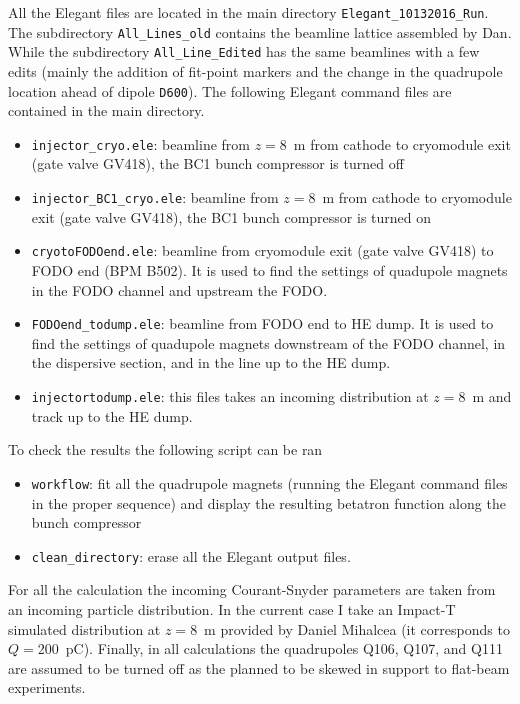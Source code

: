 \documentclass[notitlepage,twocolumn,nofootinbib,showpacs,preprintnumbers,superscriptaddress,amsmath,amssymb]{revtex4-1}
\newcommand{\impactT}{{\sc Impact-T }}
\newcommand{\elegant}{{\sc Elegant }}
\begin{document}
All the \elegant files are located in the main directory {\tt Elegant\_10132016\_Run}. The subdirectory {\tt All\_Lines\_old} contains the beamline lattice assembled by Dan. While the subdirectory {\tt All\_Line\_Edited} has the same beamlines with a few edits (mainly the addition of fit-point markers and the change in the quadrupole location ahead of dipole {\tt D600}). The following \elegant command files are contained in the main directory. 
\begin{itemize}
\item {\tt  injector\_cryo.ele}: beamline from $z=8$~m from cathode to cryomodule exit (gate valve GV418), the BC1 bunch compressor is turned off
\item {\tt  injector\_BC1\_cryo.ele}: beamline from $z=8$~m from cathode to cryomodule exit (gate valve GV418), the BC1 bunch compressor is turned on
\item {\tt cryotoFODOend.ele}: beamline from cryomodule exit (gate valve GV418) to FODO end (BPM B502). It is used to find the settings of quadupole magnets in the FODO channel and upstream the FODO. 
\item {\tt  FODOend\_todump.ele}: beamline from FODO end to HE dump. It is used to find the settings of quadupole magnets downstream of the FODO channel, in the dispersive section, and in the line up to the HE dump. 
\item {\tt  injectortodump.ele}: this files takes an incoming distribution at $z=8$~m and track up to the HE dump. 
\end{itemize}


To check the results the following script can be ran
\begin{itemize}
\item {\tt workflow}: fit all the quadrupole magnets (running the \elegant command files in the proper sequence) and display the resulting betatron function along the bunch compressor 
\item {\tt  clean\_directory}: erase all the \elegant output files. 
\end{itemize}

For all the calculation the incoming Courant-Snyder parameters are taken from an incoming particle distribution. In the current case I take an \impactT simulated distribution at $z=8$~m provided by Daniel Mihalcea (it corresponds to $Q=200$~pC).  Finally, in all calculations the quadrupoles Q106, Q107, and Q111 are assumed to be turned off as the planned to be skewed in support to flat-beam experiments. \\
\end{document}
